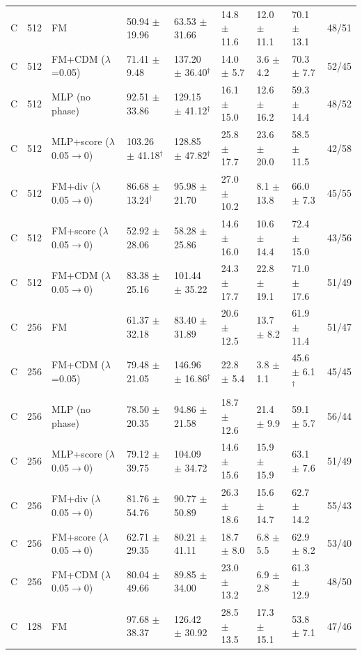\begin{tabular}{lllllllll}
C & 512 & FM & 50.94 $\pm$ 19.96 & 63.53 $\pm$ 31.66 & 14.8 $\pm$ 11.6 & 12.0 $\pm$ 11.1 & 70.1 $\pm$ 13.1 & 48/51 \\
C & 512 & FM+CDM ($\lambda$=0.05) & 71.41 $\pm$ 9.48 & 137.20 $\pm$ 36.40$^\dagger$ & 14.0 $\pm$ 5.7 & 3.6 $\pm$ 4.2 & 70.3 $\pm$ 7.7 & 52/45 \\
C & 512 & MLP (no phase) & 92.51 $\pm$ 33.86 & 129.15 $\pm$ 41.12$^\dagger$ & 16.1 $\pm$ 15.0 & 12.6 $\pm$ 16.2 & 59.3 $\pm$ 14.4 & 48/52 \\
C & 512 & MLP+score ($\lambda$ 0.05$\to$0) & 103.26 $\pm$ 41.18$^\dagger$ & 128.85 $\pm$ 47.82$^\dagger$ & 25.8 $\pm$ 17.7 & 23.6 $\pm$ 20.0 & 58.5 $\pm$ 11.5 & 42/58 \\
C & 512 & FM+div ($\lambda$ 0.05$\to$0) & 86.68 $\pm$ 13.24$^\dagger$ & 95.98 $\pm$ 21.70 & 27.0 $\pm$ 10.2 & 8.1 $\pm$ 13.8 & 66.0 $\pm$ 7.3 & 45/55 \\
C & 512 & FM+score ($\lambda$ 0.05$\to$0) & 52.92 $\pm$ 28.06 & 58.28 $\pm$ 25.86 & 14.6 $\pm$ 16.0 & 10.6 $\pm$ 14.4 & 72.4 $\pm$ 15.0 & 43/56 \\
C & 512 & FM+CDM ($\lambda$ 0.05$\to$0) & 83.38 $\pm$ 25.16 & 101.44 $\pm$ 35.22 & 24.3 $\pm$ 17.7 & 22.8 $\pm$ 19.1 & 71.0 $\pm$ 17.6 & 51/49 \\
C & 256 & FM & 61.37 $\pm$ 32.18 & 83.40 $\pm$ 31.89 & 20.6 $\pm$ 12.5 & 13.7 $\pm$ 8.2 & 61.9 $\pm$ 11.4 & 51/47 \\
C & 256 & FM+CDM ($\lambda$=0.05) & 79.48 $\pm$ 21.05 & 146.96 $\pm$ 16.86$^\dagger$ & 22.8 $\pm$ 5.4 & 3.8 $\pm$ 1.1 & 45.6 $\pm$ 6.1$^\dagger$ & 45/45 \\
C & 256 & MLP (no phase) & 78.50 $\pm$ 20.35 & 94.86 $\pm$ 21.58 & 18.7 $\pm$ 12.6 & 21.4 $\pm$ 9.9 & 59.1 $\pm$ 5.7 & 56/44 \\
C & 256 & MLP+score ($\lambda$ 0.05$\to$0) & 79.12 $\pm$ 39.75 & 104.09 $\pm$ 34.72 & 14.6 $\pm$ 15.6 & 15.9 $\pm$ 15.9 & 63.1 $\pm$ 7.6 & 51/49 \\
C & 256 & FM+div ($\lambda$ 0.05$\to$0) & 81.76 $\pm$ 54.76 & 90.77 $\pm$ 50.89 & 26.3 $\pm$ 18.6 & 15.6 $\pm$ 14.7 & 62.7 $\pm$ 14.2 & 55/43 \\
C & 256 & FM+score ($\lambda$ 0.05$\to$0) & 62.71 $\pm$ 29.35 & 80.21 $\pm$ 41.11 & 18.7 $\pm$ 8.0 & 6.8 $\pm$ 5.5 & 62.9 $\pm$ 8.2 & 53/40 \\
C & 256 & FM+CDM ($\lambda$ 0.05$\to$0) & 80.04 $\pm$ 49.66 & 89.85 $\pm$ 34.00 & 23.0 $\pm$ 13.2 & 6.9 $\pm$ 2.8 & 61.3 $\pm$ 12.9 & 48/50 \\
C & 128 & FM & 97.68 $\pm$ 38.37 & 126.42 $\pm$ 30.92 & 28.5 $\pm$ 13.5 & 17.3 $\pm$ 15.1 & 53.8 $\pm$ 7.1 & 47/46 \\

\end{tabular}
